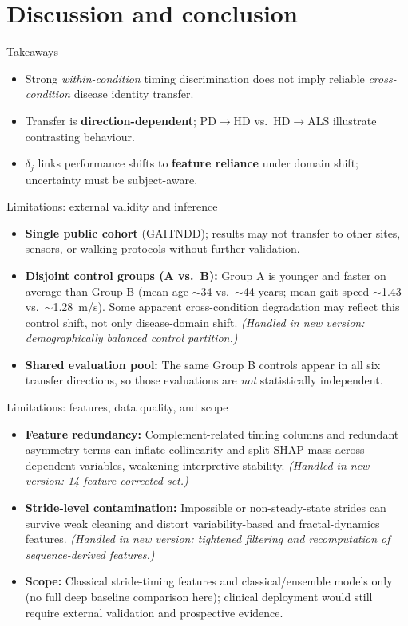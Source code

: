 \documentclass[aspectratio=43,10pt]{beamer}
\begin{document}
\section{Discussion and conclusion}

\begin{frame}{Takeaways}
  \begin{itemize}
    \item Strong \emph{within-condition} timing discrimination does not imply reliable \emph{cross-condition} disease identity transfer.
    \item Transfer is \textbf{direction-dependent}; PD$\rightarrow$HD vs.\ HD$\rightarrow$ALS illustrate contrasting behaviour.
    \item $\delta_j$ links performance shifts to \textbf{feature reliance} under domain shift; uncertainty must be subject-aware.
  \end{itemize}
\end{frame}

\begin{frame}{Limitations: external validity and inference}
  \begin{itemize}
    \item \textbf{Single public cohort} (GAITNDD); results may not transfer to other sites, sensors, or walking protocols without further validation.
    \item \textbf{Disjoint control groups (A vs.\ B):} Group A is younger and faster on average than Group B (mean age $\sim$34 vs.\ $\sim$44 years; mean gait speed $\sim$1.43 vs.\ $\sim$1.28~m/s). Some apparent cross-condition degradation may reflect this control shift, not only disease-domain shift. \textit{(Handled in new version: demographically balanced control partition.)}
    \item \textbf{Shared evaluation pool:} The same Group B controls appear in all six transfer directions, so those evaluations are \emph{not} statistically independent.
  \end{itemize}
\end{frame}

\begin{frame}{Limitations: features, data quality, and scope}
  \begin{itemize}
    \item \textbf{Feature redundancy:} Complement-related timing columns and redundant asymmetry terms can inflate collinearity and split SHAP mass across dependent variables, weakening interpretive stability. \textit{(Handled in new version: 14-feature corrected set.)}
    \item \textbf{Stride-level contamination:} Impossible or non-steady-state strides can survive weak cleaning and distort variability-based and fractal-dynamics features. \textit{(Handled in new version: tightened filtering and recomputation of sequence-derived features.)}
    \item \textbf{Scope:} Classical stride-timing features and classical/ensemble models only (no full deep baseline comparison here); clinical deployment would still require external validation and prospective evidence.
  \end{itemize}
\end{frame}
\end{document}
